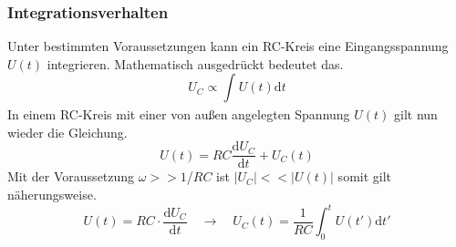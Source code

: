 \subsubsection{Integrationsverhalten}
Unter bestimmten Voraussetzungen kann ein RC-Kreis eine Eingangsspannung $U(t)$ integrieren. Mathematisch ausgedrückt bedeutet das.
\begin{equation}
U_{C} \propto \int_{}^{} U(t) \text{d}t
\end{equation}
In einem RC-Kreis mit einer von außen angelegten Spannung $U(t)$ gilt nun wieder die Gleichung.
\begin{equation*}
U(t) = RC \frac{\text{d}U_{C}}{\text{d}t} + U_{C}(t)
\end{equation*}
Mit der Voraussetzung $\omega >> 1$/$RC$ ist $|U_{C}| << |U(t)|$ somit gilt näherungsweise.
\begin{equation}
U(t) = RC \cdot \frac{\text{d}U_{C}}{\text{d}t} \quad \to \quad U_{C}(t) = \frac{1}{RC} \int_{0}^{t}U(t') \text{d}t'
\end{equation}